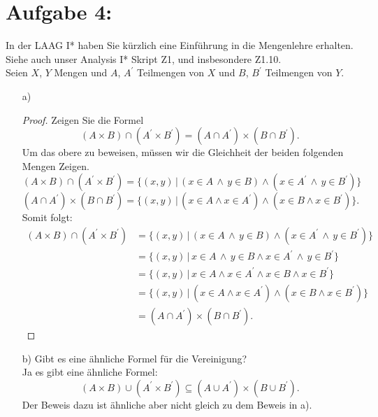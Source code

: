 \documentclass{../problemset}
\begin{document}
\section*{Aufgabe 4:}
In der LAAG I* haben Sie kürzlich eine Einführung in die Mengenlehre erhalten. Siehe
auch unser Analysis I* Skript Z1, und insbesondere Z1.10. \\
Seien $X$, $Y$ Mengen und $A$, $A^\prime$ Teilmengen von $X$ und $B$, $B^\prime$ Teilmengen von $Y$.
\begin{enumerate}
	\item[a)]
	      \begin{proof}
		      Zeigen Sie die Formel
		      \begin{displaymath}
			      (A \times B) \cap (A^\prime \times B^\prime) = (A \cap A^\prime) \times (B \cap B^\prime).
		      \end{displaymath}
		      Um das obere zu beweisen, müssen wir die Gleichheit der beiden folgenden Mengen Zeigen.
		      \[
			      (A \times B) \cap (A^\prime \times B^\prime) = \{(x,y)\,|\,( x \in A \, \land \, y\in B) \land (x \in A^\prime \, \land \, y \in B^\prime)\}
		      \]
		      \[
			      (A \cap A^\prime) \times (B \cap B^\prime) = \{(x,y)\,|\,(x \in A \land x \in A^\prime) \land (x \in B \land x \in B^\prime)\}.
		      \]
		      Somit folgt:
		      \begin{align}
			      (A \times B) \cap (A^\prime \times B^\prime) & = \{(x,y)\,|\,( x \in A \, \land \, y\in B) \land (x \in A^\prime \, \land \, y \in B^\prime)\} \\
			                                                   & = \{(x,y)\,|\,x \in A \, \land \, y\in B \land x \in A^\prime \, \land \, y \in B^\prime\}      \\
			                                                   & = \{(x,y)\,|\,x \in A \land x \in A^\prime \land x \in B \land x \in B^\prime\}                 \\
			                                                   & = \{(x,y)\,|\,(x \in A \land x \in A^\prime) \land (x \in B \land x \in B^\prime)\}             \\
			                                                   & =  (A \cap A^\prime) \times (B \cap B^\prime).
		      \end{align}
	      \end{proof}
	\item[b)]
	      Gibt es eine ähnliche Formel für die Vereinigung? \\
	      Ja es gibt eine ähnliche Formel: \[
		      (A \times B) \cup (A^\prime \times B^\prime) \subseteq (A \cup A^\prime) \times (B \cup B^\prime).
	      \]
	      Der Beweis dazu ist ähnliche aber nicht gleich zu dem Beweis in a).
\end{enumerate}
\end{document}
